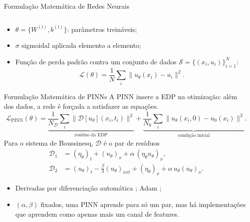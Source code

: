\begin{frame}{Formulação Matemática de Redes Neurais}
\begin{columns}[T]
\begin{center}
      \end{center}
  \end{columns}
  \begin{itemize}[<+->]
    \item $\theta = \{W^{(l)}, b^{(l)}\}$: parâmetros treináveis;
    \item $\sigma$ sigmoidal aplicada elemento a elemento;
    \item Função de perda padrão contra um conjunto de dados
          $\mathcal{S} = \{(x_i, u_i)\}_{i=1}^N$:
          \[
            \mathcal{L}(\theta) = \frac{1}{N}\sum_i \|u_\theta(x_i) - u_i\|^2 .
          \]
  \end{itemize}
\end{frame}

\begin{frame}{Formulação Matemática de PINNs}
  A PINN \parencite{raissi2019} insere a EDP na otimização: além dos dados, a rede
  é forçada a satisfazer as equações.
  \begin{equation*}
    \mathcal{L}_{\text{PINN}}(\theta)
      = \underbrace{\frac{1}{N_\mathcal{D}}\sum_{i} \bigl\| \mathcal{D}[u_\theta](x_i,t_i) \bigr\|^2}_{\text{resíduo da EDP}}
      + \underbrace{\frac{1}{N_0}\sum_{i} \bigl\| u_\theta(x_i,0) - u_0(x_i) \bigr\|^2}_{\text{condição inicial}} .
  \end{equation*}
  Para o sistema de Boussinesq, $\mathcal{D}$ é o par de resíduos
  \begin{align*}
    \mathcal{D}_1 &= (\eta_\theta)_t + (u_\theta)_x + \alpha\,(\eta_\theta u_\theta)_x, \\
    \mathcal{D}_2 &= (u_\theta)_t - \tfrac{\beta}{3}(u_\theta)_{xxt} + (\eta_\theta)_x + \alpha\,u_\theta (u_\theta)_x .
  \end{align*}
  \begin{itemize}[<+->]
    \item Derivadas por diferenciação automática
          \parencite{linnainmaa1970, paszke2019pytorch}; Adam \parencite{kingma2014adam};
    \item $(\alpha,\beta)$ fixados, uma PINN aprende para só um par, mas há implementações que aprendem como apenas mais um canal de features.
  \end{itemize}
\end{frame}

